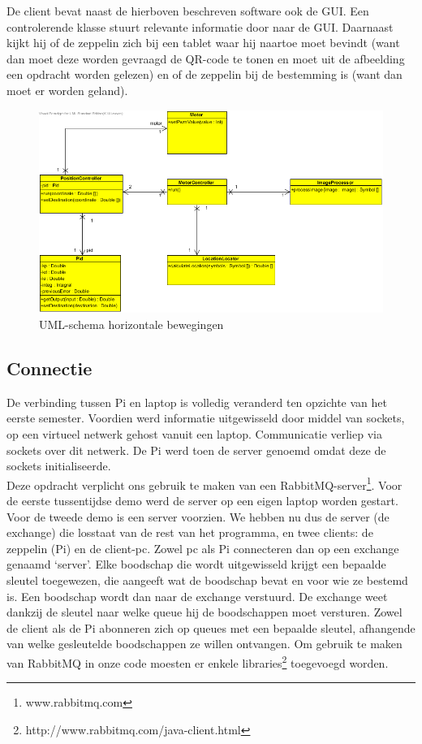 \documentclass[eind]{penoverslag}
\begin{document}
De client bevat naast de hierboven beschreven software ook de GUI. Een controlerende klasse stuurt relevante informatie door naar de GUI. Daarnaast kijkt hij of de zeppelin zich bij een tablet waar hij naartoe moet bevindt (want dan moet deze worden gevraagd de QR-code te tonen en moet uit de afbeelding een opdracht worden gelezen) en of de zeppelin bij de bestemming is (want dan moet er worden geland).\\

\begin{figure}[H]
\begin{center}
\includegraphics[width=\textwidth]{XYNavigation.png}
\end{center}
\caption{UML-schema horizontale bewegingen}
\label{navigation}
\end{figure}

\subsection{Connectie}
De verbinding tussen Pi en laptop is volledig veranderd ten opzichte van het eerste semester. Voordien werd informatie uitgewisseld door middel van sockets, op een virtueel netwerk gehost vanuit een laptop. Communicatie verliep via sockets over dit netwerk. De Pi werd toen de server genoemd omdat deze de sockets initialiseerde.\\
Deze opdracht verplicht ons gebruik te maken van een RabbitMQ-server\footnote{www.rabbitmq.com}. Voor de eerste tussentijdse demo werd de server op een eigen laptop worden gestart. Voor de tweede demo is een server voorzien. We hebben nu dus de server (de exchange) die losstaat van de rest van het programma, en twee clients: de zeppelin (Pi) en de client-pc. Zowel pc als Pi connecteren dan op een exchange genaamd ‘server’. Elke boodschap die wordt uitgewisseld krijgt een bepaalde sleutel toegewezen, die aangeeft wat de boodschap bevat en voor wie ze bestemd is. Een boodschap wordt dan naar de exchange verstuurd. De exchange weet dankzij de sleutel naar welke queue hij de boodschappen moet versturen. Zowel de client als de Pi abonneren zich op queues met een bepaalde sleutel, afhangende van welke gesleutelde boodschappen ze willen ontvangen. Om gebruik te maken van RabbitMQ in onze code moesten er enkele libraries\footnote{http://www.rabbitmq.com/java-client.html} toegevoegd worden. \\
\end{document}
